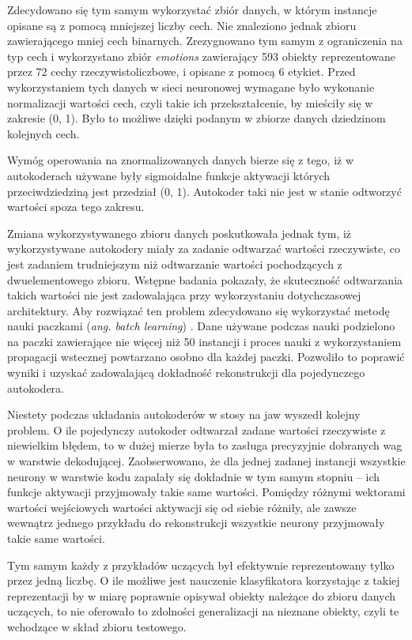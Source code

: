 \documentclass[11pt,a4paper,oneside]{report}
\begin{document}
Zdecydowano się tym samym wykorzystać zbiór danych, w którym instancje opisane są z pomocą mniejszej liczby cech. Nie znaleziono jednak zbioru zawierającego mniej cech binarnych. Zrezygnowano tym samym z ograniczenia na typ cech i wykorzystano zbiór \textit{emotions} \cite{alcala2010keel} zawierający 593 obiekty reprezentowane przez 72 cechy rzeczywistoliczbowe, i opisane z pomocą 6 etykiet. Przed wykorzystaniem tych danych w sieci neuronowej wymagane było wykonanie normalizacji wartości cech, czyli takie ich przekształcenie, by mieściły się w zakresie (0, 1). Było to możliwe dzięki podanym w zbiorze danych dziedzinom kolejnych cech.

Wymóg operowania na znormalizowanych danych bierze się z tego, iż w autokoderach używane były sigmoidalne funkcje aktywacji których przeciwdziedziną jest przedział (0, 1). Autokoder taki nie jest w stanie odtworzyć wartości spoza tego zakresu.

Zmiana wykorzystywanego zbioru danych poskutkowała jednak tym, iż wykorzystywane autokodery miały za zadanie odtwarzać wartości rzeczywiste, co jest zadaniem trudniejszym niż odtwarzanie wartości pochodzących z dwuelementowego zbioru. Wstępne badania pokazały, że skuteczność odtwarzania takich wartości nie jest zadowalająca przy wykorzystaniu dotychczasowej architektury. Aby rozwiązać ten problem zdecydowano się wykorzystać metodę nauki paczkami (\textit{ang. batch learning}) \cite{ngiam2011optimization}. Dane używane podczas nauki podzielono na paczki zawierające nie więcej niż 50 instancji i proces nauki z wykorzystaniem propagacji wstecznej powtarzano osobno dla każdej paczki. Pozwoliło to poprawić wyniki i uzyskać zadowalającą dokładność rekonstrukcji dla pojedynczego autokodera.

Niestety podczas układania autokoderów w stosy na jaw wyszedł kolejny problem. O ile pojedynczy autokoder odtwarzał zadane wartości rzeczywiste z niewielkim błędem, to w dużej mierze była to zasługa precyzyjnie dobranych wag w warstwie dekodującej. Zaobserwowano, że dla jednej zadanej instancji wszystkie neurony w warstwie kodu zapalały się dokładnie w tym samym stopniu -- ich funkcje aktywacji przyjmowały takie same wartości. Pomiędzy różnymi wektorami wartości wejściowych wartości aktywacji się od siebie różniły, ale zawsze wewnątrz jednego przykładu do rekonstrukcji wszystkie neurony przyjmowały takie same wartości. 

Tym samym każdy z przykładów uczących był efektywnie reprezentowany tylko przez jedną liczbę. O ile możliwe jest nauczenie klasyfikatora korzystając z takiej reprezentacji by w miarę poprawnie opisywał obiekty należące do zbioru danych uczących, to nie oferowało to zdolności generalizacji na nieznane obiekty, czyli te wchodzące w skład zbioru testowego.
\end{document}
